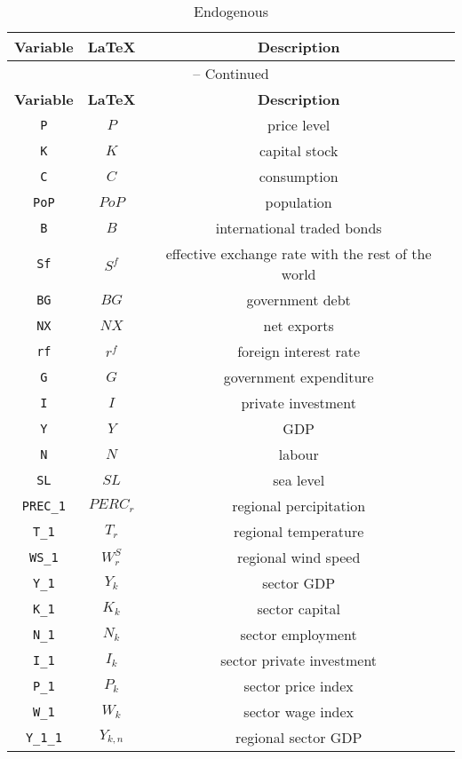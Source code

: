\begin{center}
\begin{longtable}{ccc}
\caption{Endogenous}\\%
\hline%
\multicolumn{1}{c}{\textbf{Variable}} &
\multicolumn{1}{c}{\textbf{\LaTeX}} &
\multicolumn{1}{c}{\textbf{Description}}\\%
\hline\hline%
\endfirsthead
\multicolumn{3}{c}{{\tablename} \thetable{} -- Continued}\\%
\hline%
\multicolumn{1}{c}{\textbf{Variable}} &
\multicolumn{1}{c}{\textbf{\LaTeX}} &
\multicolumn{1}{c}{\textbf{Description}}\\%
\hline\hline%
\endhead
\texttt{P} & $P$ & price level\\
\texttt{K} & $K$ & capital stock\\
\texttt{C} & $C$ & consumption\\
\texttt{PoP} & $PoP$ & population\\
\texttt{B} & $B$ & international traded bonds\\
\texttt{Sf} & $S^{f}$ & effective exchange rate with the rest of the world\\
\texttt{BG} & $BG$ & government debt\\
\texttt{NX} & $NX$ & net exports\\
\texttt{rf} & ${r^{f}}$ & foreign interest rate\\
\texttt{G} & $G$ & government expenditure\\
\texttt{I} & $I$ & private investment\\
\texttt{Y} & $Y$ & GDP\\
\texttt{N} & $N$ & labour\\
\texttt{SL} & ${SL}$ & sea level\\
\texttt{PREC\_1} & ${PERC_{r}}$ & regional percipitation\\
\texttt{T\_1} & ${T_{r}}$ & regional temperature\\
\texttt{WS\_1} & ${W_{r}^{S}}$ & regional wind speed\\
\texttt{Y\_1} & ${Y_k}$ & sector GDP\\
\texttt{K\_1} & ${K_k}$ & sector capital\\
\texttt{N\_1} & ${N_k}$ & sector employment\\
\texttt{I\_1} & ${I_k}$ & sector private investment\\
\texttt{P\_1} & ${P_k}$ & sector price index\\
\texttt{W\_1} & ${W_k}$ & sector wage index\\
\texttt{Y\_1\_1} & ${Y_{k,n}}$ & regional sector GDP\\

\end{longtable}
\end{center}
